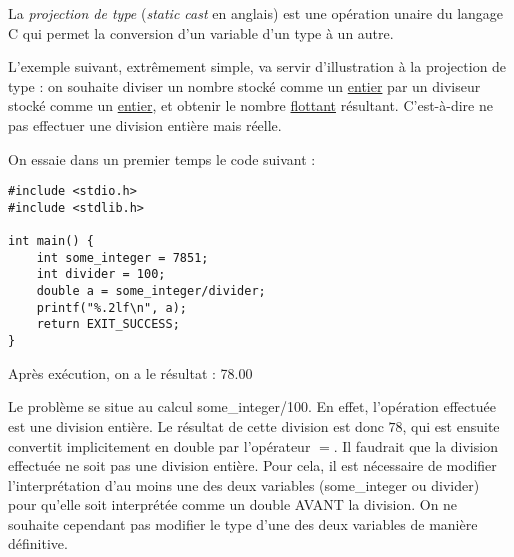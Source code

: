 \documentclass[../../../main.tex]{subfiles}
\begin{document}
La \textit{projection de type} (\textit{static cast} en anglais) est une opération unaire du langage C qui permet la conversion d'un variable d'un type à un autre.
 
L'exemple suivant, extrêmement simple, va servir d'illustration à la projection de type : on souhaite diviser un nombre stocké comme un \underline{entier} par un diviseur stocké comme un \underline{entier}, et obtenir le nombre \underline{flottant} résultant. C'est-à-dire ne pas effectuer une division entière mais réelle.
 
On essaie dans un premier temps le code suivant :
\begin{verbatim}
#include <stdio.h>
#include <stdlib.h>

int main() {
	int some_integer = 7851;
	int divider = 100;
	double a = some_integer/divider;
	printf("%.2lf\n", a);
	return EXIT_SUCCESS;
}
\end{verbatim}
Après exécution, on a le résultat : \textsf{78.00}
 
Le problème se situe au calcul \textsf{some\_integer/100}. En effet, l'opération effectuée est une division entière. Le résultat de cette division est donc $78$, qui est ensuite convertit implicitement en \textsf{double} par l'opérateur $=$. \newline
Il faudrait que la division effectuée ne soit pas une division entière. Pour cela, il est nécessaire de modifier l'interprétation d'au moins une des deux variables (\textsf{some\_integer} ou \textsf{divider}) pour qu'elle soit interprétée comme un \textsf{double} AVANT la division. On ne souhaite cependant pas modifier le type d'une des deux variables de manière définitive.
 
\end{document}
